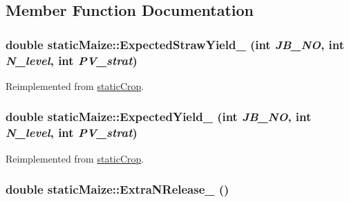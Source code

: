 \subsection{Member Function Documentation}
\hypertarget{classstatic_maize_a4aa3fc3917c90262a603de13f0fb4c67}{
\subsubsection[{ExpectedStrawYield\_\-}]{\setlength{\rightskip}{0pt plus 5cm}double staticMaize::ExpectedStrawYield\_\- (int {\em JB\_\-NO}, \/  int {\em N\_\-level}, \/  int {\em PV\_\-strat})}}
\label{classstatic_maize_a4aa3fc3917c90262a603de13f0fb4c67}


Reimplemented from \hyperlink{classstatic_crop_a884a8335aebc5effa3fecdb75af3ca85}{staticCrop}.\hypertarget{classstatic_maize_ac5efafeda6da275fff56a9bf1fa1c2a6}{
\subsubsection[{ExpectedYield\_\-}]{\setlength{\rightskip}{0pt plus 5cm}double staticMaize::ExpectedYield\_\- (int {\em JB\_\-NO}, \/  int {\em N\_\-level}, \/  int {\em PV\_\-strat})}}
\label{classstatic_maize_ac5efafeda6da275fff56a9bf1fa1c2a6}


Reimplemented from \hyperlink{classstatic_crop_ab7b9a8ecb31b10c4dcf44f13000e2f8c}{staticCrop}.\hypertarget{classstatic_maize_a251634ed082e4b2cdbe0d16bb53b54cd}{
\subsubsection[{ExtraNRelease\_\-}]{\setlength{\rightskip}{0pt plus 5cm}double staticMaize::ExtraNRelease\_\- ()}}
\label{classstatic_maize_a251634ed082e4b2cdbe0d16bb53b54cd}


